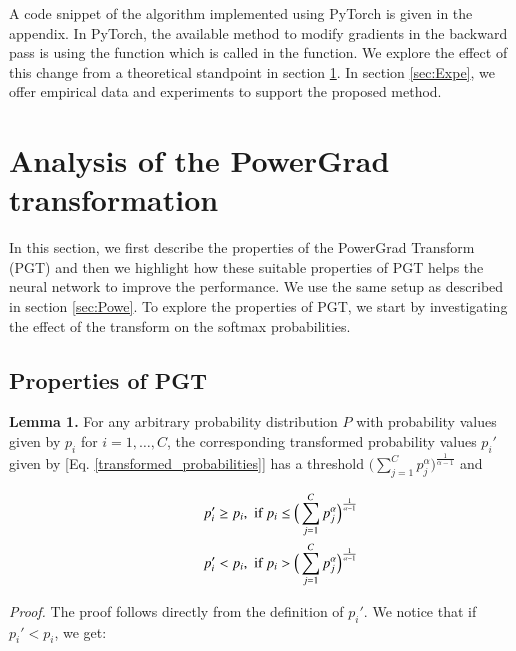 \documentclass[times,sort&compress]{elsarticle}
\begin{document}
A code snippet of the algorithm implemented using PyTorch \cite{NEURIPS2019_9015} is
given in the appendix. In PyTorch, the available method to modify gradients in the
backward pass is using the  function which is called in the
 function. We explore the effect of this change from a theoretical
standpoint in section \ref{sec:Math}. In section \ref{sec:Expe}, we offer empirical data
and experiments to support the proposed method.





\section{Analysis of the PowerGrad transformation}
\label{sec:Math}

In this section, we first describe the properties of the  PowerGrad Transform (PGT) and
then we highlight how these suitable properties of PGT helps the neural network to
improve the performance. We use the same setup as described in section \ref{sec:Powe}.
To explore the properties of PGT, we start by investigating the effect of the transform
on the softmax probabilities.

\subsection{Properties of PGT}
\label{sec:pgt_prop}

\textbf{Lemma 1.} For any arbitrary probability distribution $P$ with probability values
given by $p_i$ for $i=1,\dots,C$, the corresponding transformed probability values
$p_i'$ given by [Eq. \ref{transformed_probabilities}] has a threshold $\Big(\sum
_{j=1}^C p_j^{\alpha}\Big)^{\frac{1}{\alpha-1}}$ and

\begin{equation} \begin{split} p_i' \geq p_i & \text{,\ \ if } p_i \leq
\Big(\sum _{j=1}^C p_j^{\alpha }\Big)^{\frac{1}{\alpha-1}} \\ \hspace*{1cm}
p_i' < p_i & \text{,\ \ if } p_i > \Big(\sum _{j=1}^C
p_j^{\alpha}\Big)^{\frac{1}{\alpha-1}} \end{split} \label{eqn:threshold}
\end{equation}

\textit{Proof.} The proof follows directly from the definition of $p_i'$. We notice that
if $p_i' < p_i$, we get:
\end{document}
